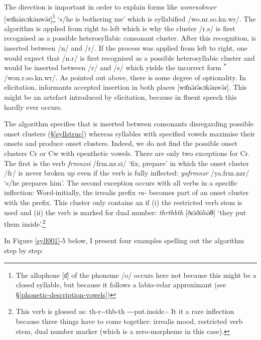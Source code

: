 The direction is important in order to explain forms like \emph{wonrsoknwr} [wɞ̆nə̆ɾsɔkə̆nwə̆ɾ]\footnote{The allophone [ɞ̆] of the phoneme /o/ occurs here not because this might be a closed syllable, but because it follows a labio-velar approximant (see \S{}\ref{phonetic-description-vowels})} `s/he is bothering me' which is syllabified /wo.nr.so.kn.wr/. The algorithm is applied from right to left which is why the cluster /r.s/ is first recognised as a possible heterosyllabic consonant cluster. After this recognition,  is inserted between /n/ and /r/. If the process was applied from left to right, one would expect that /n.r/ is first recognised as a possible heterosyllabic cluster and  would be inserted between /r/ and /s/ which yields the incorrect form \textsuperscript{$\ast$}/won.r.so.kn.wr/. As pointed out above, there is some degree of optionality. In elicitation, informants accepted  insertion in both places [wɞ̆nə̆ɾə̆sɔkə̆nwə̆ɾ]. This might be an artefact introduced by elicitation, because in fluent speech this hardly ever occurs.%

The algorithm specifies that  is inserted between consonants disregarding possible onset clusters (\S{}\ref{syllstruc}) whereas syllables with specified vowels maximise their onsets and produce onset clusters. Indeed, we do not find the possible onset clusters Cr or Cw with epenthetic vowels. There are only two exceptions for Cr. The first is the verb \emph{frmnzsi} /frm.nz.si/ `fix, prepare' in which the onset cluster /fr/ is never broken up even if the verb is fully inflected: \emph{yafrmnzr} /ya.frm.nzr/ `s/he prepares him'. The second exception occurs with all verbs in a specific inflection: Word-initially, the irrealis prefix \emph{ra-} becomes part of an onset cluster with the  prefix. This cluster only contains an  if (i) the restricted verb stem is used and (ii) the verb is marked for dual number: \emph{thrthbth} [ðɾə̆ðə̆bə̆θ] `they put them inside'.\footnote{This verb is glossed as: th-r-\Zero{}-thb-th \Stnsg-\Irr-\Ndu-put.inside.\Rs{}-\Stnsg{} It it a rare inflection because three things have to come together: irrealis mood, restricted verb stem, dual number marker (which is a zero-morpheme in this case).}%

In Figure \ref{syll001}-5 below, I present four examples spelling out the algorithm step by step:

